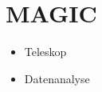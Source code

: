 \section{MAGIC}%
\label{sec:magic}

\begin{itemize}
  \item Teleskop
  \item Datenanalyse
\end{itemize}

